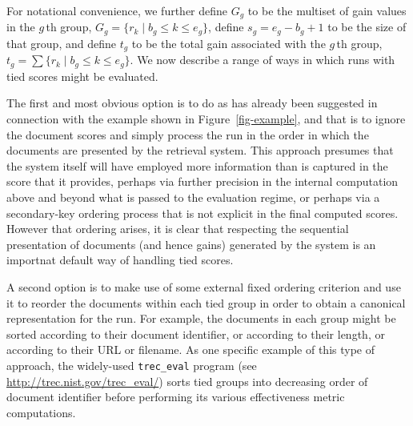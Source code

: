 For notational convenience, we further define $G_g$ to be the
multiset of gain values in the $g$\,th group,
	$G_g =\{r_k\mid b_g \le k \le e_g\}$, 
define $s_g=e_g-b_g+1$ to be the size of that group, and define $t_g$
to be the total gain associated with the $g$\,th group,
	$t_g = \sum \{r_k\mid b_g \le k \le e_g\}$.
We now describe a range of ways in which runs with tied scores might
be evaluated.


The first and most obvious option is to do as has already been
suggested in connection with the example shown in
Figure~\ref{fig-example}, and that is to ignore the document scores
and simply process the run in the order in which the documents are
presented by the retrieval system.
This approach presumes that the system itself will have employed more
information than is captured in the score that it provides, perhaps
via further precision in the internal computation above and beyond
what is passed to the evaluation regime, or perhaps via a
secondary-key ordering process that is not explicit in the final
computed scores.
However that ordering arises, it is clear that respecting the
sequential presentation of documents (and hence gains) generated by
the system is an importnat default way of handling tied scores.


A second option is to make use of some external fixed ordering
criterion and use it to reorder the documents within each tied group
in order to obtain a canonical representation for the run.
For example, the documents in each group might be sorted according to
their document identifier, or according to their length, or according
to their URL or filename.
As one specific example of this type of approach, the widely-used
{\tt{trec\_eval}} program (see
{\small\url{http://trec.nist.gov/trec_eval/}}) sorts tied groups into
decreasing order of document identifier before performing its various
effectiveness metric computations.


